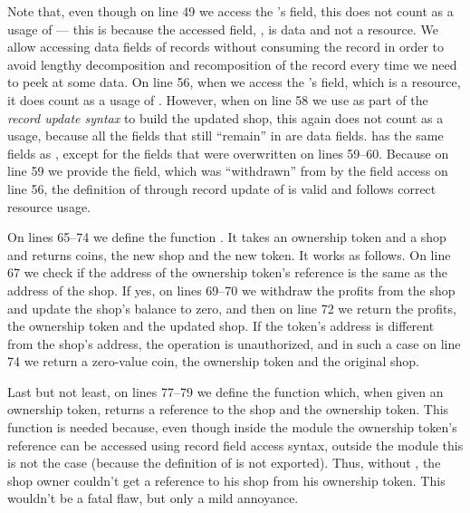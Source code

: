 Note that, even though on line 49 we access the 's  field, this does not count as a usage of  --- this is because the accessed field, , is data and not a resource. We allow accessing data fields of records without consuming the record in order to avoid lengthy decomposition and recomposition of the record every time we need to peek at some data. On line 56, when we access the 's  field, which is a resource, it does count as a usage of . However, when on line 58 we use  as part of the \textit{record update syntax} to build the updated shop, this again does not count as a usage, because all the fields that still ``remain'' in  are data fields.  has the same fields as , except for the fields that were overwritten on lines 59--60. Because on line 59 we provide the  field, which was ``withdrawn'' from  by the field access on line 56, the definition of  through record update of  is valid and follows correct resource usage.

On lines 65--74 we define the function . It takes an ownership token and a shop and returns coins, the new shop and the new token. It works as follows. On line 67 we check if the address of the ownership token's reference is the same as the address of the shop. If yes, on lines 69--70 we withdraw the profits from the shop and update the shop's balance to zero, and then on line 72 we return the profits, the ownership token and the updated shop. If the token's address is different from the shop's address, the operation is unauthorized, and in such a case on line 74 we return a zero-value coin, the ownership token and the original shop.

Last but not least, on lines 77--79 we define the function  which, when given an ownership token, returns a reference to the shop and the ownership token. This function is needed because, even though inside the  module the ownership token's reference can be accessed using record field access syntax, outside the module this is not the case (because the definition of  is not exported). Thus, without , the shop owner couldn't get a reference to his shop from his ownership token. This wouldn't be a fatal flaw, but only a mild annoyance.


